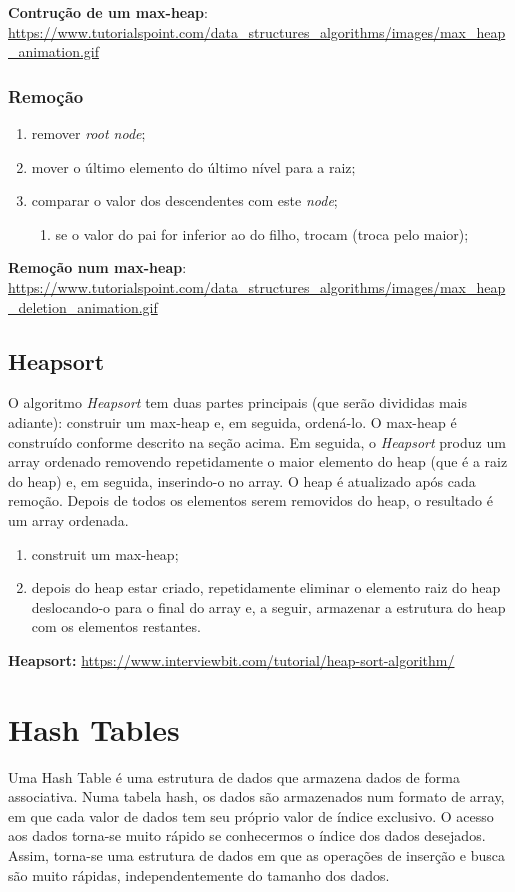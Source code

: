 \documentclass[a4paper, 12pt]{article}
\begin{document}
\textbf{Contrução de um max-heap}: \url{https://www.tutorialspoint.com/data_structures_algorithms/images/max_heap_animation.gif}

\subsubsection{Remoção}
\begin{enumerate}
    \item remover \emph{root node};
    \item mover o último elemento do último nível para a raiz;
    \item comparar o valor dos descendentes com este \emph{node};
    \begin{enumerate}
        \item se o valor do pai for inferior ao do filho, trocam (troca pelo maior);
    \end{enumerate}
\end{enumerate}

\textbf{Remoção num max-heap}: \url{https://www.tutorialspoint.com/data_structures_algorithms/images/max_heap_deletion_animation.gif}

\subsection{Heapsort}
O algoritmo \emph{Heapsort} tem duas partes principais (que serão divididas mais adiante): construir um max-heap e, em seguida, ordená-lo. O max-heap é construído conforme descrito na seção acima. Em seguida, o \emph{Heapsort} produz um array ordenado removendo repetidamente o maior elemento do heap (que é a raiz do heap) e, em seguida, inserindo-o no array. O heap é atualizado após cada remoção. Depois de todos os elementos serem removidos do heap, o resultado é um array ordenada.

\begin{enumerate}
    \item construit um max-heap;
    \item depois do heap estar criado, repetidamente eliminar o elemento raiz do heap deslocando-o para o final do array e, a seguir, armazenar a estrutura do heap com os elementos restantes.
\end{enumerate}

\textbf{Heapsort:} \url{https://www.interviewbit.com/tutorial/heap-sort-algorithm/} 

\newpage

\section{Hash Tables}
Uma Hash Table é uma estrutura de dados que armazena dados de forma associativa. Numa tabela hash, os dados são armazenados num formato de array, em que cada valor de dados tem seu próprio valor de índice exclusivo. O acesso aos dados torna-se muito rápido se conhecermos o índice dos dados desejados. Assim, torna-se uma estrutura de dados em que as operações de inserção e busca são muito rápidas, independentemente do tamanho dos dados.
\end{document}
